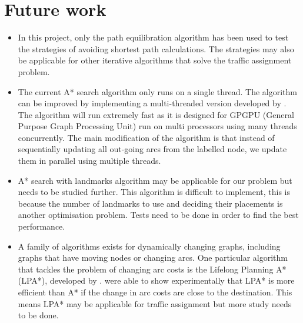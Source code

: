 \section{Future work}
\begin{itemize}
    \item In this project, only the path equilibration algorithm has been used to test the strategies of avoiding shortest path calculations.
        The strategies may also be applicable for other iterative algorithms that solve the traffic assignment problem.

    \item The current A* search algorithm only runs on a single thread.
        The algorithm can be improved by implementing a multi-threaded version developed
        by \citet{Inam}.
        The algorithm will run extremely fast as it is designed for GPGPU (General Purpose Graph Processing Unit) run on multi processors using many threads concurrently.
        The main modification of the algorithm is that instead of sequentially updating all out-going arcs from the labelled node,
        we update them in parallel using multiple threads.

    \item A* search with landmarks algorithm may be applicable for our problem but needs to be studied further.
        This algorithm is difficult to implement,
        this is because the number of landmarks to use and deciding their placements is another optimisation problem.
        Tests need to be done in order to find the best performance.

    \item A family of algorithms exists for dynamically changing graphs,
        including graphs that have moving nodes or changing arcs.
        One particular algorithm that tackles the problem of changing arc costs is the Lifelong Planning A* (LPA*), developed by \citet{LPA*}.
        \citet{LPA*} were able to show experimentally that LPA* is more efficient than A* if the change in arc costs are close to the destination.
        This means LPA* may be applicable for traffic assignment but more study needs to be done.
\end{itemize}


